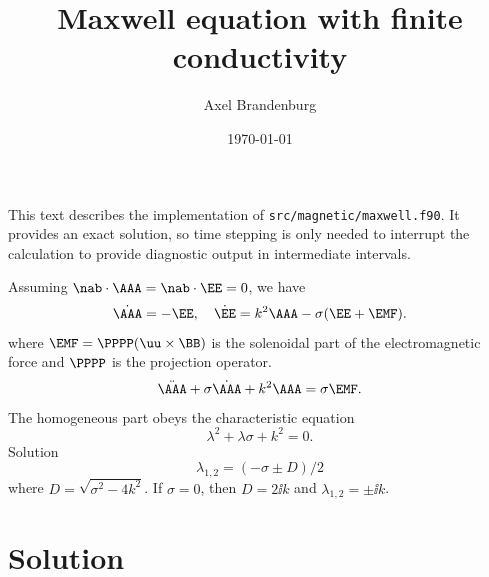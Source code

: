 \documentclass[twocolumn]{article}
\title{Maxwell equation with finite conductivity}
\author{Axel Brandenburg}
\date{\today}
\begin{document}
\maketitle

This text describes the implementation of
{\tt src/magnetic/maxwell.f90}.
It provides an exact solution, so time stepping
is only needed to interrupt the calculation
to provide diagnostic output in intermediate
intervals.

Assuming $\nab\cdot\AAA=\nab\cdot\EE=0$, we have
\begin{equation}
\dot{\AAA}=-\EE,\quad
\dot{\EE}=k^2\AAA-\sigma(\EE+\EMF).
\end{equation}
where $\EMF=\PPPP(\uu\times\BB)$ is the solenoidal part of
the electromagnetic force and $\PPPP$ is the projection operator.
\begin{equation}
\ddot{\AAA}+\sigma\dot{\AAA}+k^2\AAA=\sigma\EMF.
\end{equation}
The homogeneous part obeys the characteristic equation
\begin{equation}
\lambda^2+\lambda\sigma+k^2=0.
\end{equation}
Solution
\begin{equation}
\lambda_{1,2}=(-\sigma\pm D)/2
\end{equation}
where $D=\sqrt{\sigma^2-4k^2}$.
If $\sigma=0$, then $D=2\ii k$ and
$\lambda_{1,2}=\pm\ii k$.

\section{Solution}
\end{document}
